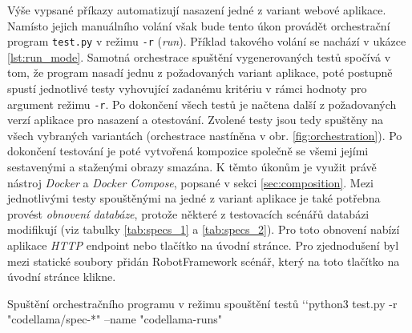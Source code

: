 \documentclass[czech, ma, kiv, he, iso690alph, pdf, viewonly]{fasthesis}
\begin{document}
    Výše vypsané příkazy automatizují nasazení jedné z variant webové aplikace. Namísto jejich manuálního volání však bude tento úkon provádět orchestrační program \verb|test.py| v režimu \verb|-r| (\textit{run}). Příklad takového volání se nachází v ukázce \ref{lst:run_mode}. Samotná orchestrace spuštění vygenerovaných testů spočívá v tom, že program nasadí jednu z požadovaných variant aplikace, poté postupně spustí jednotlivé testy vyhovující zadanému kritériu v rámci hodnoty pro argument režimu \verb|-r|. Po dokončení všech testů je načtena další z požadovaných verzí aplikace pro nasazení a otestování. Zvolené testy jsou tedy spuštěny na všech vybraných variantách (orchestrace nastíněna v obr. \ref{fig:orchestration}). Po dokončení testování je poté vytvořená kompozice společně se všemi jejími sestavenými a staženými obrazy smazána. K těmto úkonům je využit právě nástroj \textit{Docker} a \textit{Docker Compose}, popsané v sekci \ref{sec:composition}. Mezi jednotlivými testy spouštěnými na jedné z variant aplikace je také potřebna provést \textit{obnovení databáze}, protože některé z testovacích scénářů databázi modifikují (viz tabulky \ref{tab:specs_1} a \ref{tab:specs_2}). Pro toto obnovení nabízí aplikace \textit{HTTP} endpoint nebo tlačítko na úvodní stránce. Pro zjednodušení byl mezi statické soubory přidán RobotFramework scénář, který na toto tlačítko na úvodní stránce klikne.

    \begin{console}{Spuštění orchestračního programu v režimu spouštění testů \label{lst:run_mode}}
`\uxprompt`python3 test.py -r "codellama/spec-*" --name "codellama-runs"
    \end{console}
\end{document}
